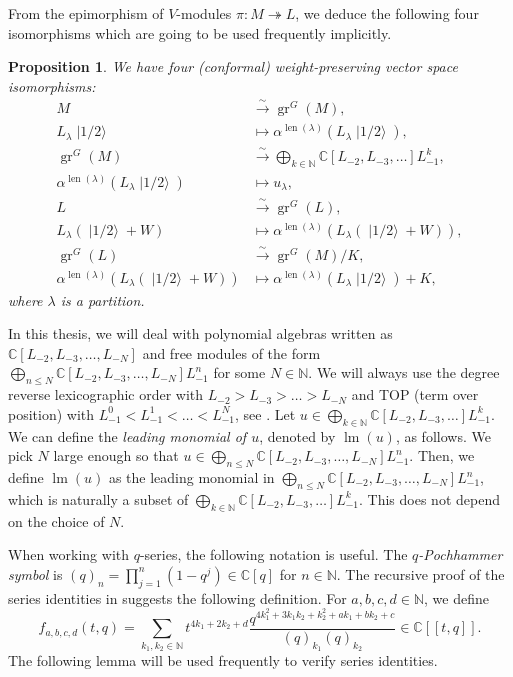\documentclass[a4paper, 12pt, reqno]{amsart}
\newtheorem{proposition}[theorem]{Proposition}
\theoremstyle{remark}
\DeclareMathOperator{\gr}{gr}
\DeclareMathOperator{\lm}{lm}
\DeclareMathOperator{\len}{len}
\DeclareMathOperator{\vachalf}{|1/2\rangle}
\begin{document}
From the epimorphism of $V$-modules $\pi: M \twoheadrightarrow L$, we deduce the following four isomorphisms which are going to be used frequently implicitly.

\begin{proposition}
  \label{prp:20}
  We have four (conformal) weight-preserving vector space isomorphisms:
  \begin{align*}
    M &\xrightarrow{\sim} \gr^G(M), \\
    L_{\lambda}\vachalf &\mapsto \alpha^{\len(\lambda)}(L_{\lambda}\vachalf), \\
    \gr^G(M) &\xrightarrow{\sim} \bigoplus_{k \in \mathbb{N}}\mathbb{C}[L_{-2}, L_{-3}, \dots]L_{-1}^k, \\
    \alpha^{\len(\lambda)}(L_{\lambda}\vachalf) &\mapsto u_{\lambda}, \\
    L &\xrightarrow{\sim} \gr^G(L), \\
    L_{\lambda}(\vachalf + W) &\mapsto \alpha^{\len(\lambda)}(L_{\lambda}(\vachalf + W)), \\
    \gr^G(L) &\xrightarrow{\sim} \gr^G(M)/K, \\
    \alpha^{\len(\lambda)}(L_{\lambda}(\vachalf + W)) &\mapsto \alpha^{\len(\lambda)}(L_{\lambda}\vachalf) + K,
  \end{align*}
  where $\lambda$ is a partition.
\end{proposition}

In this thesis, we will deal with polynomial algebras written as $\mathbb{C}[L_{-2}, L_{-3}, \dots, L_{-N}]$ and free modules of the form $\bigoplus_{n \le N}\mathbb{C}[L_{-2}, L_{-3}, \dots, L_{-N}]L_{-1}^n$ for some $N \in \mathbb{N}$.
We will always use the degree reverse lexicographic order with $L_{-2} > L_{-3} > \dots > L_{-N}$ and TOP (term over position) with $L_{-1}^0 < L_{-1}^1 < \dots < L_{-1}^N$, see \cite[\S3.5]{adams_introduction_1994}.
Let $u \in \bigoplus_{k \in \mathbb{N}}\mathbb{C}[L_{-2}, L_{-3}, \dots]L_{-1}^k$.
We can define the \emph{leading monomial of $u$}, denoted by $\lm(u)$, as follows.
We pick $N$ large enough so that $u \in \bigoplus_{n \le N}\mathbb{C}[L_{-2}, L_{-3}, \dots, L_{-N}]L_{-1}^n$.
Then, we define $\lm(u)$ as the leading monomial in $\bigoplus_{n \le N}\mathbb{C}[L_{-2}, L_{-3}, \dots, L_{-N}]L_{-1}^n$, which is naturally a subset of $\bigoplus_{k \in \mathbb{N}}\mathbb{C}[L_{-2}, L_{-3}, \dots]L_{-1}^k$.
This does not depend on the choice of $N$.

When working with $q$-series, the following notation is useful.
The \emph{$q$-Pochhammer symbol} is $(q)_n = \prod_{j = 1}^n(1 - q^j) \in \mathbb{C}[q]$ for $n \in \mathbb{N}$.
The recursive proof of the series identities in \cite{andrews_singular_2022} suggests the following definition.
For $a, b, c, d \in \mathbb{N}$, we define
\begin{equation*}
  f_{a, b, c, d}(t, q) = \sum_{k_1, k_2 \in \mathbb{N}}t^{4k_1 + 2k_2 + d}\frac{q^{4k_1^2 + 3k_1k_2 + k_2^2 + ak_1 + bk_2 + c}}{(q)_{k_1}(q)_{k_2}} \in \mathbb{C}[[t, q]].
\end{equation*}
The following lemma will be used frequently to verify series identities.
\end{document}
